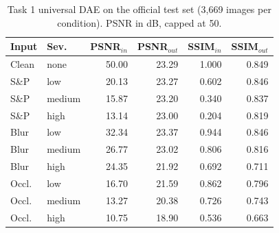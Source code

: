\begin{table}[t]\centering\caption{Task 1 universal DAE on the official test set (3{,}669 images per condition). PSNR in dB, capped at 50.}\label{tab:t1}\setlength{\tabcolsep}{4pt}
\begin{tabular}{llrrrr}\toprule
Input & Sev. & PSNR$_{in}$ & PSNR$_{out}$ & SSIM$_{in}$ & SSIM$_{out}$\\ \midrule
Clean & none & 50.00 & 23.29 & 1.000 & 0.849 \\
S\&P & low & 20.13 & 23.27 & 0.602 & 0.846 \\
S\&P & medium & 15.87 & 23.20 & 0.340 & 0.837 \\
S\&P & high & 13.14 & 23.00 & 0.204 & 0.819 \\
Blur & low & 32.34 & 23.37 & 0.944 & 0.846 \\
Blur & medium & 26.77 & 23.02 & 0.806 & 0.816 \\
Blur & high & 24.35 & 21.92 & 0.692 & 0.711 \\
Occl. & low & 16.70 & 21.59 & 0.862 & 0.796 \\
Occl. & medium & 13.27 & 20.38 & 0.726 & 0.743 \\
Occl. & high & 10.75 & 18.90 & 0.536 & 0.663 \\
\bottomrule\end{tabular}\end{table}
